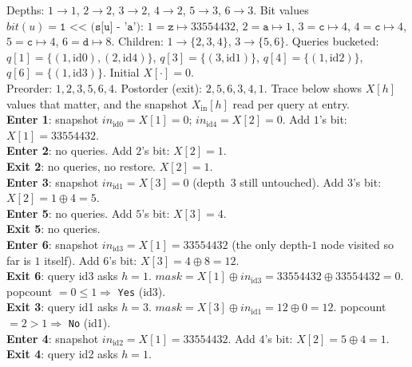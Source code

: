 \begin{tracebox}[CF 570D sample: $n{=}6$, parents $1,1,1,3,3$, string \texttt{zacccd}, $m{=}5$ queries]
Depths: $1\!\to\!1$, $2\!\to\!2$, $3\!\to\!2$, $4\!\to\!2$, $5\!\to\!3$,
$6\!\to\!3$. Bit values $\mathit{bit}(u)=\texttt{1 << (s[u] - 'a')}$:
$1{=}\texttt{z}\mapsto 33554432$, $2{=}\texttt{a}\mapsto 1$,
$3{=}\texttt{c}\mapsto 4$, $4{=}\texttt{c}\mapsto 4$, $5{=}\texttt{c}\mapsto 4$,
$6{=}\texttt{d}\mapsto 8$. Children: $1\!\to\!\{2,3,4\}$,
$3\!\to\!\{5,6\}$. Queries bucketed:
$\mathit{q}[1]=\{(1,\text{id}0),(2,\text{id}4)\}$,
$\mathit{q}[3]=\{(3,\text{id}1)\}$, $\mathit{q}[4]=\{(1,\text{id}2)\}$,
$\mathit{q}[6]=\{(1,\text{id}3)\}$. Initial $\mathit{X}[\cdot]=0$.
\\[3pt]
Preorder: $1, 2, 3, 5, 6, 4$. Postorder (exit): $2, 5, 6, 3, 4, 1$. Trace
below shows $\mathit{X}[h]$ values that matter, and the snapshot
$\mathit{X}_{\text{in}}[h]$ read per query at entry.
\\[3pt]
\textbf{Enter 1}: snapshot $\mathit{in}_{\text{id}0}=\mathit{X}[1]=0$;
$\mathit{in}_{\text{id}4}=\mathit{X}[2]=0$. Add $1$'s bit:
$\mathit{X}[1]=33554432$.\\
\textbf{Enter 2}: no queries. Add $2$'s bit: $\mathit{X}[2]=1$.\\
\textbf{Exit 2}: no queries, no restore. $\mathit{X}[2]=1$.\\
\textbf{Enter 3}: snapshot $\mathit{in}_{\text{id}1}=\mathit{X}[3]=0$
(depth~$3$ still untouched). Add $3$'s bit: $\mathit{X}[2]=1\oplus 4=5$.\\
\textbf{Enter 5}: no queries. Add $5$'s bit: $\mathit{X}[3]=4$.\\
\textbf{Exit 5}: no queries.\\
\textbf{Enter 6}: snapshot $\mathit{in}_{\text{id}3}=\mathit{X}[1]=33554432$
(the only depth-$1$ node visited so far is $1$ itself). Add $6$'s bit:
$\mathit{X}[3]=4\oplus 8=12$.\\
\textbf{Exit 6}: query id3 asks $h{=}1$.
$\mathit{mask}=\mathit{X}[1]\oplus\mathit{in}_{\text{id}3}=33554432\oplus 33554432=0$.
popcount $=0\le 1 \Rightarrow$ \texttt{Yes} (id3).\\
\textbf{Exit 3}: query id1 asks $h{=}3$.
$\mathit{mask}=\mathit{X}[3]\oplus\mathit{in}_{\text{id}1}=12\oplus 0=12$.
popcount $=2 > 1 \Rightarrow$ \texttt{No} (id1).\\
\textbf{Enter 4}: snapshot $\mathit{in}_{\text{id}2}=\mathit{X}[1]=33554432$.
Add $4$'s bit: $\mathit{X}[2]=5\oplus 4=1$.\\
\textbf{Exit 4}: query id2 asks $h{=}1$.

\end{tracebox}
